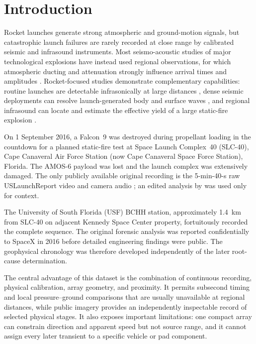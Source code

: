 \documentclass[]{seismica}
\begin{document}
\section{Introduction}
\label{sec:introduction}

Rocket launches generate strong atmospheric and ground-motion signals, but
catastrophic launch failures are rarely recorded at close range by calibrated
seismic and infrasound instruments. Most seismo-acoustic studies of major
technological explosions have instead used regional observations, for which
atmospheric ducting and attenuation strongly influence arrival times and
amplitudes \citep{ottemoller_2008,green_2008,ceranna_2009,smink_2019,
pilger_beirut_2021,kim_pasyanos_2022}. Rocket-focused studies demonstrate
complementary capabilities: routine launches are detectable infrasonically at
large distances \citep{pilger_rocket_2021}, dense seismic deployments can
resolve launch-generated body and surface waves
\citep{schuster_rocketquake_2025}, and regional infrasound can locate and
estimate the effective yield of a large static-fire explosion
\citep{silber_scamfer_newglenn_2026}.

On 1 September 2016, a Falcon~9 was destroyed during propellant loading in the
countdown for a planned static-fire test at Space Launch Complex~40 (SLC-40),
Cape Canaveral Air Force Station (now Cape Canaveral Space Force Station),
Florida. The AMOS-6 payload was lost and the launch complex was extensively
damaged. The only publicly available original recording is the 5-min-40-s raw
USLaunchReport video and camera audio \citep{uslaunchreport_amos6_video_2016};
an edited analysis by \citet{manley_spacex_explosion_2016} was used only for
context.

The University of South Florida (USF) BCHH station, approximately 1.4~km from
SLC-40 on adjacent Kennedy Space Center property, fortuitously recorded the
complete sequence. The original forensic analysis was reported confidentially
to SpaceX in 2016 before detailed engineering findings were public. The
geophysical chronology was therefore developed independently of the later
root-cause determination.

The central advantage of this dataset is the combination of continuous
recording, physical calibration, array geometry, and proximity. It permits
subsecond timing and local pressure--ground comparisons that are usually
unavailable at regional distances, while public imagery provides an
independently inspectable record of selected physical stages. It also exposes
important limitations: one compact array can constrain direction and apparent
speed but not source range, and it cannot assign every later transient to a
specific vehicle or pad component.
\end{document}
